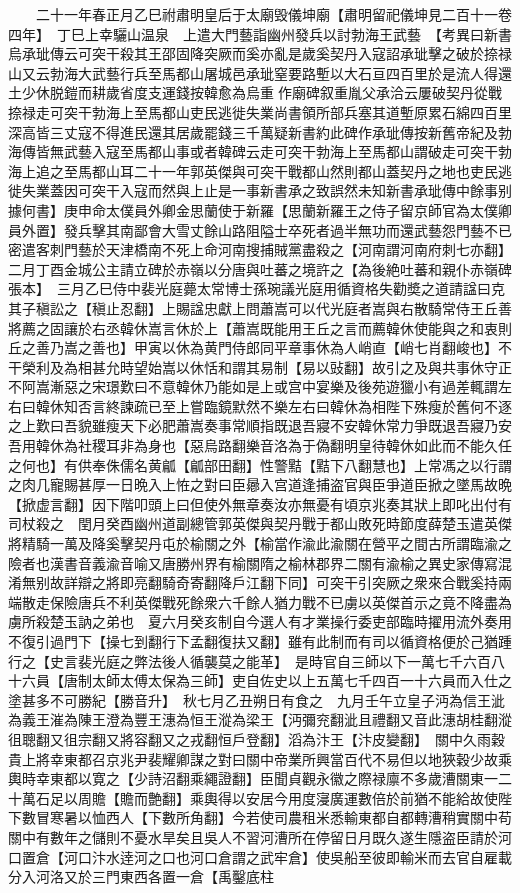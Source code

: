 　　二十一年春正月乙巳祔肅明皇后于太廟毁儀坤廟【肅明留祀儀坤見二百十一卷四年】　丁巳上幸驪山温泉　上遣大門藝詣幽州發兵以討勃海王武藝　【考異曰新書烏承玼傳云可突干殺其王邵固降突厥而奚亦亂是歲奚契丹入寇詔承玼擊之破於捺禄山又云勃海大武藝行兵至馬都山屠城邑承玼窒要路塹以大石亘四百里於是流人得還土少休脱鎧而耕歲省度支運錢按韓愈為烏重作廟碑叙重胤父承洽云屢破契丹從戰捺禄走可突干勃海上至馬都山吏民逃徙失業尚書領所部兵塞其道塹原累石綿四百里深高皆三丈寇不得進民還其居歲罷錢三千萬疑新書約此碑作承玼傳按新舊帝紀及勃海傳皆無武藝入寇至馬都山事或者韓碑云走可突干勃海上至馬都山謂破走可突干勃海上追之至馬都山耳二十一年郭英傑與可突干戰都山然則都山蓋契丹之地也吏民逃徙失業蓋因可突干入寇而然與上止是一事新書承之致誤然未知新書承玼傳中餘事别據何書】庚申命太僕員外卿金思蘭使于新羅【思蘭新羅王之侍子留京師官為太僕卿員外置】發兵擊其南鄙會大雪丈餘山路阻隘士卒死者過半無功而還武藝怨門藝不已密遣客刺門藝於天津橋南不死上命河南搜捕賊黨盡殺之【河南謂河南府刺七亦翻】　二月丁酉金城公主請立碑於赤嶺以分唐與吐蕃之境許之【為後絶吐蕃和親仆赤嶺碑張本】　三月乙巳侍中裴光庭薨太常博士孫琬議光庭用循資格失勸奬之道請諡曰克其子稹訟之【稹止忍翻】上賜諡忠獻上問蕭嵩可以代光庭者嵩與右散騎常侍王丘善將薦之固讓於右丞韓休嵩言休於上【蕭嵩既能用王丘之言而薦韓休使能與之和衷則丘之善乃嵩之善也】甲寅以休為黄門侍郎同平章事休為人峭直【峭七肖翻峻也】不干榮利及為相甚允時望始嵩以休恬和謂其易制【易以䜴翻】故引之及與共事休守正不阿嵩漸惡之宋璟歎曰不意韓休乃能如是上或宫中宴樂及後苑遊獵小有過差輒謂左右曰韓休知否言終諫疏已至上嘗臨鏡默然不樂左右曰韓休為相陛下殊瘦於舊何不逐之上歎曰吾貌雖瘦天下必肥蕭嵩奏事常順指既退吾寢不安韓休常力爭既退吾寢乃安吾用韓休為社稷耳非為身也【惡烏路翻樂音洛為于偽翻明皇待韓休如此而不能久任之何也】有供奉侏儒名黄㼐【㼐部田翻】性警黠【黠下八翻慧也】上常馮之以行謂之肉几寵賜甚厚一日晩入上恠之對曰臣曏入宫道逢捕盗官與臣爭道臣掀之墜馬故晩【掀虚言翻】因下階叩頭上曰但使外無章奏汝亦無憂有頃京兆奏其狀上即叱出付有司杖殺之　閏月癸酉幽州道副總管郭英傑與契丹戰于都山敗死時節度薛楚玉遣英傑將精騎一萬及降奚擊契丹屯於榆關之外【榆當作渝此渝關在營平之間古所謂臨渝之險者也漢書音義渝音喻又唐勝州界有榆關隋之榆林郡界二關有渝榆之異史家傳寫混淆無别故詳辯之將即亮翻騎奇寄翻降戶江翻下同】可突干引突厥之衆來合戰奚持兩端散走保險唐兵不利英傑戰死餘衆六千餘人猶力戰不已虜以英傑首示之竟不降盡為虜所殺楚玉訥之弟也　夏六月癸亥制自今選人有才業操行委吏部臨時擢用流外奏用不復引過門下【操七到翻行下孟翻復扶又翻】雖有此制而有司以循資格便於己猶踵行之【史言裴光庭之弊法後人循襲莫之能革】　是時官自三師以下一萬七千六百八十六員【唐制太師太傅太保為三師】吏自佐史以上五萬七千四百一十六員而入仕之塗甚多不可勝紀【勝音升】　秋七月乙丑朔日有食之　九月壬午立皇子沔為信王泚為義王漼為陳王澄為豐王潓為恒王漎為梁王【沔彌兖翻泚且禮翻又音此潓胡桂翻漎徂聰翻又徂宗翻又將容翻又之戎翻恒戶登翻】滔為汴王【汴皮變翻】　關中久雨穀貴上將幸東都召京兆尹裴耀卿謀之對曰關中帝業所興當百代不易但以地狹穀少故乘輿時幸東都以寛之【少詩沼翻乘繩證翻】臣聞貞觀永徽之際禄廪不多歲漕關東一二十萬石足以周贍【贍而艶翻】乘輿得以安居今用度寖廣運數倍於前猶不能給故使陛下數冒寒暑以恤西人【下數所角翻】今若使司農租米悉輸東都自都轉漕稍實關中苟關中有數年之儲則不憂水旱矣且吳人不習河漕所在停留日月既久遂生隱盗臣請於河口置倉【河口汴水逹河之口也河口倉謂之武牢倉】使吳船至彼即輸米而去官自雇載分入河洛又於三門東西各置一倉【禹鑿底柱